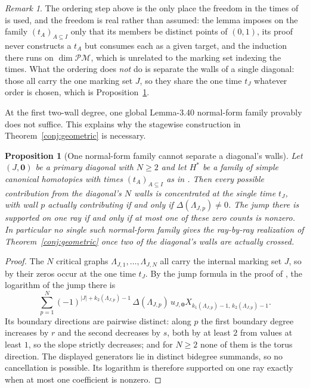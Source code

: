\documentclass[11pt]{amsart}
\newtheorem{proposition}[theorem]{Proposition}
\theoremstyle{definition}
\theoremstyle{remark}
\newtheorem{remark}[theorem]{Remark}
\begin{document}
\begin{remark}
\label{rem:orderinggap}
The ordering step above is the only place the freedom in the times of
\cite[Lem.~3.40]{GKT} is used, and the freedom is real
rather than assumed: the lemma imposes on the family $(t_{A})_{A\subseteq I}$ only
that its members be distinct points of $(0,1)$, its proof never constructs a $t_{A}$ but consumes
each as a given target, and the induction there runs on $\dim\mathcal{PM}$, which
is unrelated to the marking set indexing the times. What the ordering does
\emph{not} do is separate the walls of a single diagonal: those all carry the one
marking set $J$, so they share the one time $t_{J}$ whatever order is chosen, which
is Proposition~\ref{prop:obstruction}.
\end{remark}

At the first two-wall degree, one global Lemma-3.40 normal-form family provably
does not suffice. This explains why the stagewise construction in
Theorem~\ref{conj:geometric} is necessary.

\begin{proposition}[One normal-form family cannot separate a diagonal's walls]
\label{prop:obstruction}
Let $(J,\mathbf 0)$ be a primary diagonal with $N\ge2$ and let $H^{*}$ be a family
of simple canonical homotopies with times $(t_{A})_{A\subseteq I}$ as in
\cite[Lem.~3.40]{GKT}. Then every possible contribution from the diagonal's
$N$ walls is concentrated at the single time $t_{J}$, with wall $p$ actually
contributing if and only if $\Delta(\Lambda_{J,p})\ne0$. The jump there is
supported on one ray if and only if at most one of these zero counts is nonzero.
In particular no single
such normal-form family gives the ray-by-ray realization of
Theorem~\ref{conj:geometric} once two of the diagonal's walls are actually
crossed.
\end{proposition}

\begin{proof}
The $N$ critical graphs $\Lambda_{J,1},\dots,\Lambda_{J,N}$ all carry the internal
marking set $J$, so by \cite[Lem.~3.40(3)(a)]{GKT} their zeros occur at the one
time $t_{J}$. By the jump formula in the proof of
\cite[Thm.~5.9]{GKT}, the logarithm of the jump there is
\[
\sum_{p=1}^{N}(-1)^{|J|+k_{2}(\Lambda_{J,p})-1}\,\Delta(\Lambda_{J,p})\,
u_{J,\mathbf0}X_{k_{1}(\Lambda_{J,p})-1,\,k_{2}(\Lambda_{J,p})-1}.
\]
Its boundary directions are pairwise distinct: along $p$ the first
boundary degree increases by $r$ and the second decreases by $s$, both by at least
$2$ from values at least $1$, so the slope strictly decreases; and for $N\ge2$ none
of them is the torus direction. The displayed generators lie in distinct
bidegree summands, so no cancellation is possible. Its logarithm is therefore
supported on one ray exactly when at most one coefficient is nonzero.
\end{proof}
\end{document}
